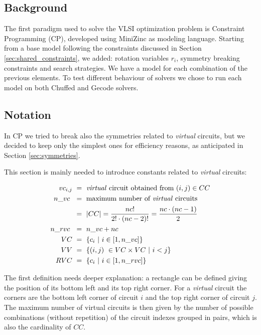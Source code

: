 
\subsection{Background}
The first paradigm used to solve the VLSI optimization problem is Constraint Programming (CP),
developed using MiniZinc as modeling language.
Starting from a base model following the constraints discussed in Section \ref{sec:shared_constraints},
we added: rotation variables $r_i$, symmetry breaking constraints and search strategies. We have a model
for each combination of the previous elements.
To test different behaviour of solvers we chose to run each model on both Chuffed and Gecode solvers.


\subsection{Notation} \label{sec:CP_notation}
In CP we tried to break also the symmetries related to \textit{virtual} circuits, but we decided to
keep only the simplest ones for efficiency reasons, as anticipated in Section \ref{sec:symmetries}.

This section is mainly needed to introduce constants related to \textit{virtual} circuits:

\begin{align*}
  vc_{i,j} & \ =\ \text{\textit{virtual} circuit obtained from  } (i,j) \in CC      \\
  n\_vc\   & \ =\ \text{maximum number of \textit{virtual} circuits}                \\
           & \ =\ |CC| = \frac{nc!}{2! \cdot (nc - 2)!} = \frac{nc \cdot (nc-1)}{2} \\
  n\_rvc\  & \ =\ n\_vc + nc                                                        \\
  VC       & \ =\ \{ c_i\ |\ i \in [1,n\_vc] \}                                     \\
  VV       & \ =\ \{ (i,j)\ \in VC \times VC\ |\ i <j \}                            \\
  RVC      & \ =\ \{ c_i\ |\ i \in [1,n\_rvc] \}                                    \\
\end{align*}

The first definition needs deeper explanation: a rectangle can be defined giving the position
of its bottom left and its top right corner. For a \textit{virtual} circuit the corners are the
bottom left corner of circuit $i$ and the top right corner of circuit $j$.
The maximum number of virtual circuits is then given by the number of possible combinations
(without repetition) of the circuit indexes grouped in pairs, which is also the cardinality of $CC$.



